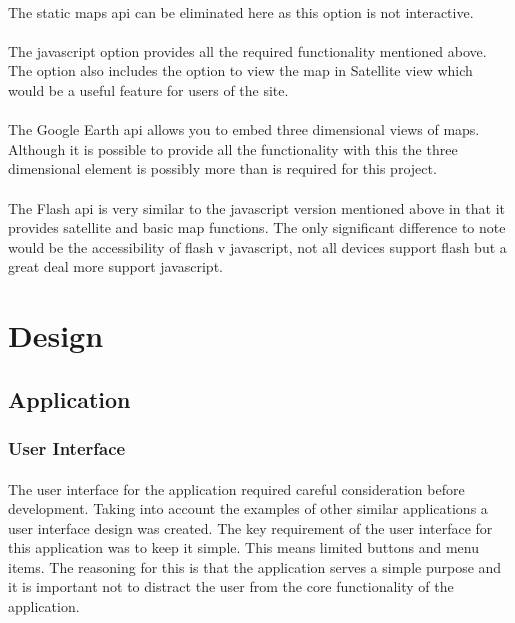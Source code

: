 \documentclass[12pt]{article}
\begin{document}
\paragraph{}
The static maps \gls{api} can be eliminated here as this option is not interactive. 

\paragraph{}
The javascript option provides all the required functionality mentioned above. The option also includes the option to view the map in Satellite view which would be a useful feature for users of the site. 

\paragraph{}
The Google Earth \gls{api} allows you to embed three dimensional views of maps. Although it is possible to provide all the functionality with this the three dimensional element is possibly more than is required for this project. 


\paragraph{}
The Flash \gls{api} is very similar to the javascript version mentioned above in that it provides satellite and basic map functions. The only significant difference to note would be the accessibility of flash v javascript, not all devices support flash but a great deal more support javascript.

\section{Design}

\subsection{Application}
\subsubsection{User Interface}
\paragraph{}


The user interface for the application required careful consideration before development. Taking into account the examples of other similar applications a user interface design was created. The key requirement of the user interface for this application was to keep it simple. This means limited buttons and menu items. The reasoning for this is that the application serves a simple purpose and it is important not to distract the user from the core functionality of the application.
\end{document}
